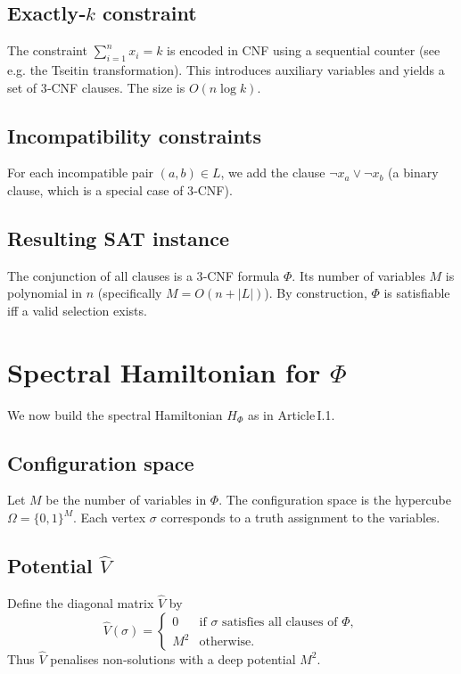 \documentclass[11pt,a4paper]{article}
\begin{document}
\subsection{Exactly‑\(k\) constraint}
The constraint \(\sum_{i=1}^n x_i = k\) is encoded in CNF using a sequential counter (see e.g. the Tseitin transformation). This introduces auxiliary variables and yields a set of 3‑CNF clauses. The size is \(O(n \log k)\).

\subsection{Incompatibility constraints}
For each incompatible pair \((a,b)\in L\), we add the clause \(\neg x_a \lor \neg x_b\) (a binary clause, which is a special case of 3‑CNF).

\subsection{Resulting SAT instance}
The conjunction of all clauses is a 3‑CNF formula \(\Phi\). Its number of variables \(M\) is polynomial in \(n\) (specifically \(M = O(n + |L|)\)). By construction, \(\Phi\) is satisfiable iff a valid selection exists.

\section{Spectral Hamiltonian for \(\Phi\)}

We now build the spectral Hamiltonian \(H_{\Phi}\) as in Article I.1.

\subsection{Configuration space}
Let \(M\) be the number of variables in \(\Phi\). The configuration space is the hypercube \(\Omega = \{0,1\}^M\). Each vertex \(\sigma\) corresponds to a truth assignment to the variables.

\subsection{Potential \(\hat{V}\)}
Define the diagonal matrix \(\hat{V}\) by
\[
\hat{V}(\sigma) = 
\begin{cases}
0 & \text{if } \sigma \text{ satisfies all clauses of } \Phi,\\
M^2 & \text{otherwise}.
\end{cases}
\]
Thus \(\hat{V}\) penalises non‑solutions with a deep potential \(M^2\).
\end{document}
